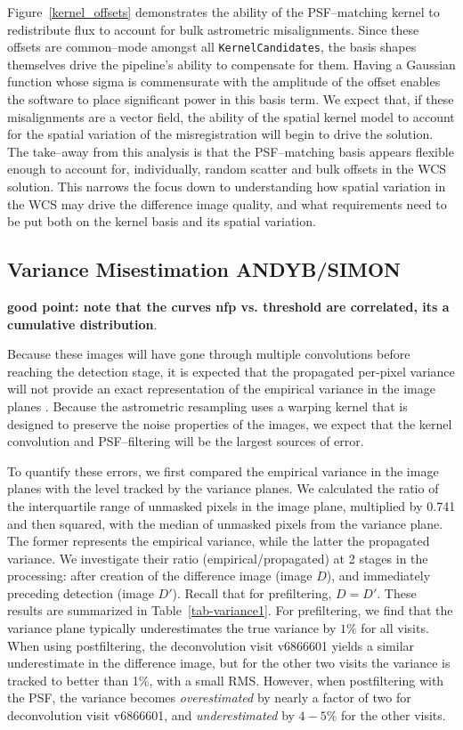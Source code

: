 \documentclass[prd, nofootinbib, floatfix, 11pt,tightenlines,times]{article}
\begin{document}
Figure~\ref{kernel_offsets} demonstrates the ability of the
PSF--matching kernel to redistribute flux to account for bulk
astrometric misalignments.  Since these offsets are common--mode
amongst all {\tt KernelCandidates}, the basis shapes themselves drive
the pipeline's ability to compensate for them.  Having a Gaussian
function whose sigma is commensurate with the amplitude of the offset
enables the software to place significant power in this basis term.  We
expect that, if these misalignments are a vector field, the ability of
the spatial kernel model to account for the spatial variation of the
misregistration will begin to drive the solution.  The take--away
from this analysis is that the PSF--matching basis appears flexible
enough to account for, individually, random scatter and bulk offsets
in the WCS solution.  This narrows the focus down to understanding how
spatial variation in the WCS may drive the difference image quality,
and what requirements need to be put both on the kernel basis and its
spatial variation.





\subsection{Variance Misestimation {\bf ANDYB/SIMON}}

{\bf good point: note that the curves nfp vs. threshold are
  correlated, its a cumulative distribution}.

Because these images will have gone through multiple convolutions
before reaching the detection stage, it is expected that the
propagated per-pixel variance will not provide an exact representation
of the empirical variance in the image planes \citep{Price-Stacking}.
Because the astrometric resampling uses a warping kernel that is
designed to preserve the noise properties of the images, we expect
that the kernel convolution and PSF--filtering will be the largest
sources of error.

To quantify these errors, we first compared the empirical variance in
the image planes with the level tracked by the variance planes.  We
calculated the ratio of the interquartile range of unmasked pixels in
the image plane, multiplied by 0.741 and then squared, with the median
of unmasked pixels from the variance plane.  The former represents the
empirical variance, while the latter the propagated variance.  We
investigate their ratio (empirical/propagated) at 2 stages in the
processing: after creation of the difference image (image $D$), and
immediately preceding detection (image $D'$).  Recall that for
prefiltering, $D = D'$.  These results are summarized in
Table~\ref{tab-variance1}.  For prefiltering, we find that the
variance plane typically underestimates the true variance by $1\%$ for
all visits.  When using postfiltering, the deconvolution visit
v6866601 yields a similar underestimate in the difference image, but
for the other two visits the variance is tracked to better than 1\%,
with a small RMS.  However, when postfiltering with the PSF, the
variance becomes {\it overestimated} by nearly a factor of two for
deconvolution visit v6866601, and {\it underestimated} by $4-5\%$ for
the other visits.
\end{document}
